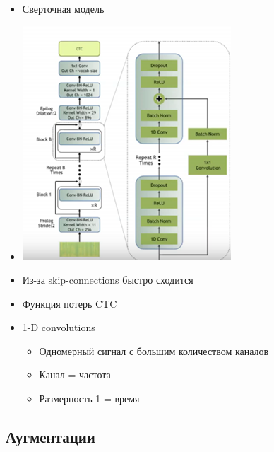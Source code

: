 \documentclass[a4paper, 12pt]{article}
\begin{document}
\begin{itemize}
\item
  
  Сверточная модель
  
\item
  
  \includegraphics[width=3.07813in,height=3.44708in]{media/image12.png}
  
\item
  
  Из-за skip-connections быстро сходится
  
\item
  
  Функция потерь CTC
  
\item
  
  1-D convolutions
  

  \begin{itemize}
  \item
    
    Одномерный сигнал с большим количеством каналов
    
  \item
    
    Канал = частота
    
  \item
    
    Размерность 1 = время
    
  \end{itemize}
\end{itemize}

\subsection{Аугментации}\label{ux430ux443ux433ux43cux435ux43dux442ux430ux446ux438ux438}
\end{document}
